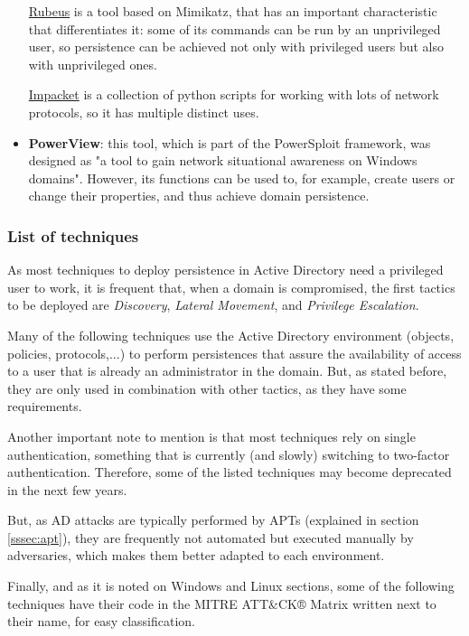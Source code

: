 \begin{itemize}
\underline{Rubeus}\cite{Rubeus} is a tool based on Mimikatz, that has an important characteristic that differentiates it: some of its commands can be run by an unprivileged user, so persistence can be achieved not only with privileged users but also with unprivileged ones.

\underline{Impacket}\cite{Impacket} is a collection of python scripts for working with lots of network protocols, so it has multiple distinct uses. 

\item \textbf{PowerView}: this tool, which is part of the PowerSploit framework\cite{PowerView}, was designed as "a tool to gain network situational awareness on Windows domains". However, its functions can be used to, for example, create users or change their properties, and thus achieve domain persistence.  

\end{itemize}

\subsubsection{List of techniques}
\label{sssec:adTec}
As most techniques to deploy persistence in Active Directory need a privileged user to work, it is frequent that, when a domain is compromised, the first tactics to be deployed are \textit{Discovery}\cite{MitreDisc}, \textit{Lateral Movement}\cite{MitreLM}, and \textit{Privilege Escalation}\cite{MitrePE}.

Many of the following techniques use the Active Directory environment (objects, policies, protocols,...) to perform persistences that assure the availability of access to a user that is already an administrator in the domain. But, as stated before, they are only used in combination with other tactics, as they have some requirements. 

Another important note to mention is that most techniques rely on single authentication, something that is currently (and slowly) switching to two-factor authentication. Therefore, some of the listed techniques may become deprecated in the next few years.

But, as AD attacks are typically performed by APTs (explained in section \ref{sssec:apt}), they are frequently not automated but executed manually by adversaries, which makes them better adapted to each environment. 

Finally, and as it is noted on Windows and Linux sections, some of the following techniques have their code in the MITRE ATT\&CK® Matrix\cite{Mitre} written next to their name, for easy classification.

